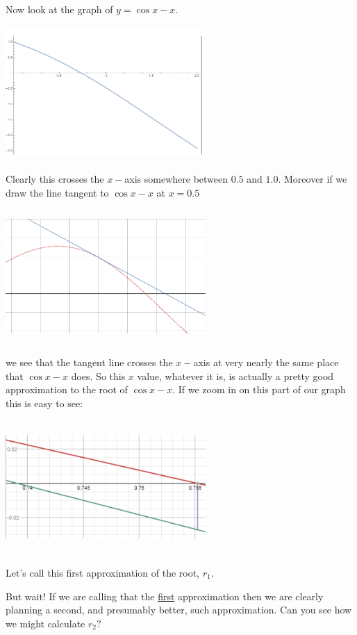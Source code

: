 Now look at the graph of $y=\cos x -x.$\\
\centerline{\includegraphics*[height=2in,width=3in]{Figures/cosx-x}}
Clearly this crosses the $x-$axis somewhere between $0.5$ and $1.0.$
Moreover if we draw the line tangent to $\cos x -x$ at $x=0.5$ \\
\centerline{\includegraphics*[height=2in,width=3in]{Figures/cosx-x2}}
we see that the tangent line crosses the $x-$axis at very nearly the
same place that $\cos x- x $ does. So this $x$ value, whatever it is,
is actually a pretty good approximation to the root of $\cos x -x.$ If
we zoom in on this part of our graph this is easy to see:\\
\centerline{\includegraphics*[height=2in,width=3in]{Figures/cosx-x3}}
Let's call this  first approximation of the root, $r_1.$

But wait! If we are calling that the \underline{first} approximation
then we are clearly planning a second, and presumably better, such
approximation. Can you see how we might calculate $r_2?$

